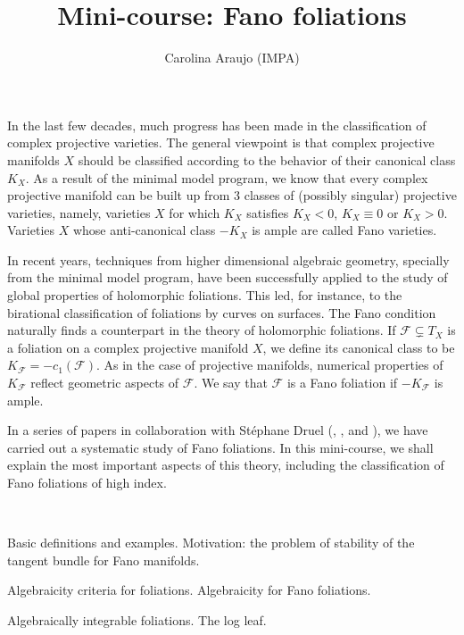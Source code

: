\documentclass[12pt]{article}
\begin{document}
\title{Mini-course: Fano foliations}
\author{Carolina Araujo (IMPA)}
\date{}

\maketitle

In the last few decades, much progress has been made in the classification of complex projective varieties.
The general viewpoint is that complex projective manifolds $X$ should be classified according to the behavior of their canonical class $K_X$.
As a result of the minimal model program, we know that every complex projective manifold can be built up from
3 classes of (possibly singular) projective varieties, namely,  varieties $X$ for which  $K_X$  satisfies
$K_X<0$, $K_X\equiv 0$ or $K_X>0$. 
Varieties $X$ whose anti-canonical class $-K_X$ is ample are called Fano varieties. 


In recent years, techniques from higher dimensional algebraic geometry, specially from 
the minimal model program, have been successfully applied to the study of global properties of 
holomorphic foliations. 
This led, for instance, to the birational classification of foliations by curves on surfaces.
The Fano condition naturally finds a counterpart in the theory of holomorphic foliations.
If $\mathcal{F}\subsetneq T_X$ is a foliation on a  complex projective manifold $X$, we define its canonical class to be 
$K_{\mathcal{F}}=-c_1(\mathcal{F})$. As in the case of projective manifolds,  numerical properties of $K_{\mathcal{F}}$
reflect geometric aspects of $\mathcal{F}$. 
We say that  $\mathcal{F}$ is a Fano foliation if $-K_{\mathcal{F}}$ is ample.

In a series of papers in collaboration with St{\'e}phane Druel (\cite{fano_fols}, \cite{codim_1_del_pezzo_fols}, \cite{fano_fols_2} and \cite{codim_1_mukai_fols}),  
we have carried out a systematic study of Fano foliations. 
In this mini-course, we shall explain the most important aspects of this theory, including the classification of Fano foliations of high index. 

\

 Basic definitions and examples. Motivation: the problem of stability of the tangent bundle for Fano manifolds. 

 Algebraicity criteria for foliations. Algebraicity for Fano foliations. 

 Algebraically integrable foliations. The log leaf. 
\end{document}
